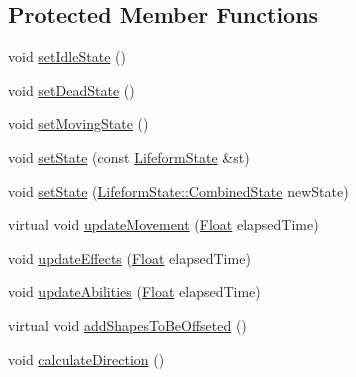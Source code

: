 \subsection*{Protected Member Functions}
\begin{DoxyCompactItemize}
\item 
void \hyperlink{classZeta_1_1Lifeform_a12b1e47a03118fddd9186235f8812363}{set\+Idle\+State} ()
\item 
void \hyperlink{classZeta_1_1Lifeform_ab1b89c60a06773c5c5ea853d0cfc6c89}{set\+Dead\+State} ()
\item 
void \hyperlink{classZeta_1_1Lifeform_a4d456e5d04dc5d727e86ba8662b05ba3}{set\+Moving\+State} ()
\item 
void \hyperlink{classZeta_1_1Lifeform_ae0b3f022a32c0d3553b735a11b46a393}{set\+State} (const \hyperlink{classZeta_1_1LifeformState}{Lifeform\+State} \&st)
\item 
void \hyperlink{classZeta_1_1Lifeform_abb64d379ec1ade8adbcc57a01e12c7d4}{set\+State} (\hyperlink{classZeta_1_1LifeformState_a877fbe4e8efefd0a5323f950909181b6}{Lifeform\+State\+::\+Combined\+State} new\+State)
\item 
virtual void \hyperlink{classZeta_1_1Lifeform_a6f0e5123f472a9c45a89ef13ec115bf0}{update\+Movement} (\hyperlink{namespaceZeta_a1e0a1265f9b3bd3075fb0fabd39088ba}{Float} elapsed\+Time)
\item 
void \hyperlink{classZeta_1_1Lifeform_a4ec6399acd21b86d5a54d8486620dcb4}{update\+Effects} (\hyperlink{namespaceZeta_a1e0a1265f9b3bd3075fb0fabd39088ba}{Float} elapsed\+Time)
\item 
void \hyperlink{classZeta_1_1Lifeform_aaf8874404bce339925fed45aa8754c13}{update\+Abilities} (\hyperlink{namespaceZeta_a1e0a1265f9b3bd3075fb0fabd39088ba}{Float} elapsed\+Time)
\item 
virtual void \hyperlink{classZeta_1_1Lifeform_a685f1911becf86807c1148ce2e8b1d0b}{add\+Shapes\+To\+Be\+Offseted} ()
\item 
void \hyperlink{classZeta_1_1Lifeform_aa56fa0ecbf19526166739b7fb9106412}{calculate\+Direction} ()
\end{DoxyCompactItemize}
